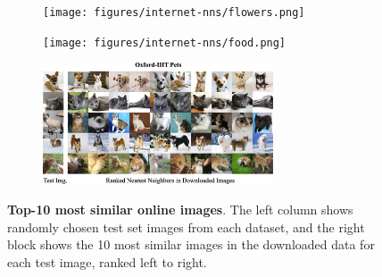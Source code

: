 \begin{figure}[p]
    \centering
    
    \begin{subfigure}{\textwidth}
        \centering
        \texttt{[image: figures/internet-nns/flowers.png]}
    \end{subfigure}
    \vspace{0.1em}

    \begin{subfigure}{\textwidth}
        \centering
        \texttt{[image: figures/internet-nns/food.png]}
    \end{subfigure}
    \vspace{0.1em}

    \begin{subfigure}{\textwidth}
        \centering
        \includegraphics[width=0.75\textwidth]{figures/internet-nns/pets.png}
    \end{subfigure}
    \vspace{0.1em}
    
    \caption{
        \textbf{Top-10 most similar online images}.
        The left column shows randomly chosen test set images from each dataset, and the right block shows the 10 most similar images in the downloaded data for each test image,
        ranked left to right.
    }
    \label{fig:online_images}
\end{figure}

